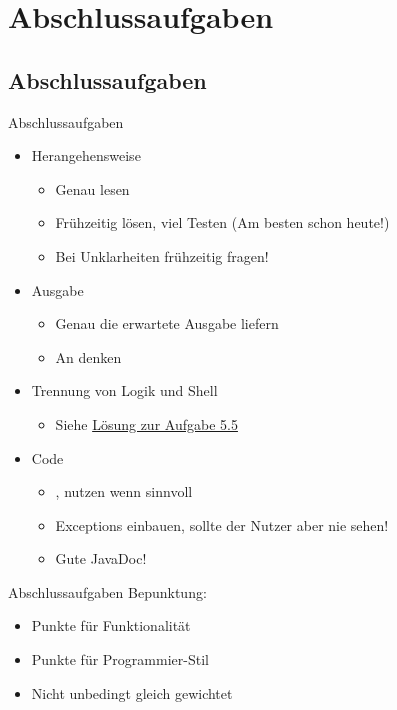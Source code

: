 \documentclass[usepdftitle=false,hyperref={pdfpagelabels=false}]{beamer}
\begin{document}
\section{Abschlussaufgaben}
\subsection{Abschlussaufgaben}
\begin{frame}{Abschlussaufgaben}
    \begin{itemize}
        \item Herangehensweise
            \begin{itemize}
                \item Genau lesen
                \item Frühzeitig lösen, viel Testen (Am besten schon heute!)
                \item Bei Unklarheiten frühzeitig fragen!
            \end{itemize}
        \item Ausgabe
            \begin{itemize}
                \item Genau die erwartete Ausgabe liefern
                \item An  denken
            \end{itemize}
        \item Trennung von Logik und Shell
            \begin{itemize}
                \item Siehe \href{https://github.com/MartinThoma/prog-ws1213/tree/master/Blatt-05.5}{Lösung zur Aufgabe 5.5}
            \end{itemize}
        \item Code
            \begin{itemize}
                \item {},  nutzen wenn sinnvoll
                \item Exceptions einbauen, sollte der Nutzer aber nie sehen!
                \item Gute JavaDoc!
            \end{itemize}
    \end{itemize}
\end{frame}

\begin{frame}{Abschlussaufgaben}
    Bepunktung:
    \begin{itemize}
        \item Punkte für Funktionalität
        \item Punkte für Programmier-Stil
        \item Nicht unbedingt gleich gewichtet
    \end{itemize}
\end{frame}
\end{document}
